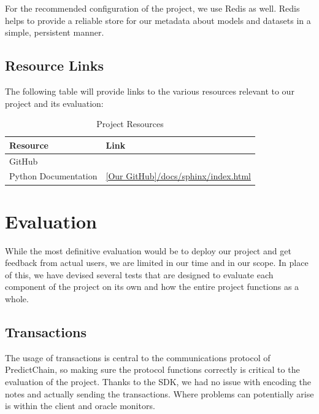 \documentclass{ledger}
\begin{document}
For the recommended configuration of the project, we use Redis as well.  Redis helps to provide a reliable store for
our metadata about models and datasets in a simple, persistent manner.

\subsection{Resource Links}

The following table will provide links to the various resources relevant to our project and its evaluation:

\begin{table}[H]
    \caption{{Project Resources}}
    \label{tab:resources}
    \centering
    \begin{tabular}{|p{3cm}|p{11cm}|}
        \hline
        \textbf{Resource} & \textbf{Link}\\
        \hline
        GitHub & \href{}{}\\
        \hline
        Python Documentation & \href{}{
        [Our GitHub]/docs/sphinx/index.html}\\
        \hline
    \end{tabular}
\end{table}

\section{Evaluation}

While the most definitive evaluation would be to deploy our project and get feedback from actual users, we are limited
in our time and in our scope.  In place of this, we have devised several tests that are designed to evaluate each
component of the project on its own and how the entire project functions as a whole.

\subsection{Transactions}

The usage of transactions is central to the communications protocol of PredictChain, so making sure the protocol
functions correctly is critical to the evaluation of the project.  Thanks to the SDK, we had no issue with encoding the
notes and actually sending the transactions.  Where problems can potentially arise is within the
client and oracle monitors.
\end{document}

